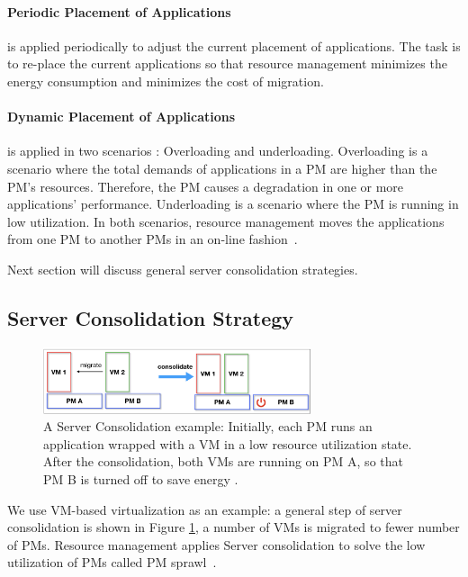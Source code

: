 \paragraph{Periodic Placement of Applications} is applied periodically to adjust the current placement of applications. The task is to re-place the current applications so that resource management minimizes the energy consumption and minimizes the cost of migration.

\paragraph{Dynamic Placement of Applications} is applied in two scenarios \cite{Mishra:2012kx}: Overloading and underloading. Overloading is a scenario where the total demands of applications in a PM are higher than the PM's resources. Therefore, the PM causes a degradation in one or more applications' performance. Underloading is a scenario where the PM is running in low utilization. In both scenarios, resource management moves the applications from one PM to another PMs in an on-line fashion~\cite{Borodin:2cY4439E}.

Next section will discuss general server consolidation strategies.

\subsection{Server Consolidation Strategy}
\label{consolidation}

\begin{figure}
	\centering
	\includegraphics[width=0.7\textwidth]{pics/consolidate.png}
	\caption{A Server Consolidation example: Initially, each PM runs an application wrapped with a VM in a low resource utilization state. After the consolidation, both VMs are running on PM A, so that PM B is turned off to save energy \cite{Barroso:2007jt}.}
	\label{fig:consolidation}
\end{figure}


 We use VM-based virtualization as an example: a general step of server consolidation is shown in Figure \ref{fig:consolidation}, a number of VMs is migrated to fewer number of PMs. Resource management applies Server consolidation to solve 
the low utilization of PMs called PM sprawl~\cite{Khanna:2006vq}.

